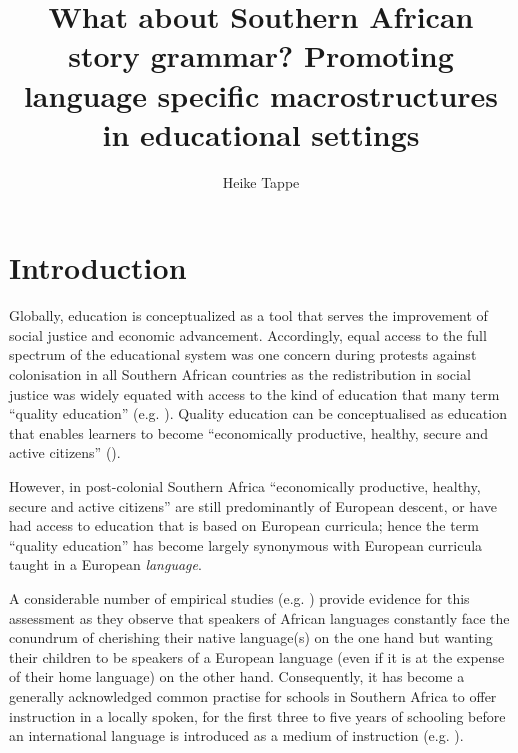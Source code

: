 \documentclass[output=paper,modfonts]{langscibook}
\title{What about Southern African story grammar? Promoting language specific macrostructures in educational settings}
\author{Heike Tappe\affiliation{University of KwaZulu-Natal, Howard College Campus, Linguistics Programme} 
}
\begin{document}
\maketitle
   

 



\section{Introduction}\label{sec:tappe:1}


Globally, education is conceptualized as a tool that serves the improvement of social justice and economic advancement. Accordingly, equal access to the full spectrum of the educational system was one  concern during protests against colonisation in all Southern African countries as the redistribution in social justice was widely equated with access to the kind of education that many term “quality education” (e.g. \citealt{Tikly2011}). Quality education can be conceptualised as education that enables learners to become “economically productive, healthy, secure and active citizens” (\citealt[9]{Tikly2011}). 

However, in post-colonial Southern Africa “economically productive, healthy, secure and active citizens” are still predominantly of European descent, or have had access to education that is based on European curricula; hence the term “quality education” has become largely synonymous with European curricula taught in a European \textit{language}. 

A considerable number of empirical studies (e.g. \citealt{Orman2008,Nomlomo2010,Nkosana2011,EvansCleghorn2014}) provide evidence for this assessment as they observe that speakers of African languages constantly face the conundrum of cherishing their native language(s) on the one hand but wanting their children to be speakers of a European language (even if it is at the expense of their home language) on the other hand. Consequently, it has become a generally acknowledged common practise for schools in Southern Africa to offer instruction in a locally spoken,  for the first three to five years of schooling before an international language is introduced as a medium of instruction (e.g. \citealt[3]{Bloch2006}). 
\end{document}
